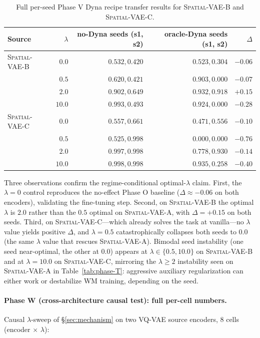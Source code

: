 \documentclass{article}
\newcommand{\srcVA}{\textsc{Spatial-VAE-A}}
\newcommand{\srcVB}{\textsc{Spatial-VAE-B}}
\newcommand{\srcVC}{\textsc{Spatial-VAE-C}}
\begin{document}
\begin{table}[h]
  \centering
  \small
  \caption{Full per-seed Phase V Dyna recipe transfer results for \srcVB{} and \srcVC{}.}
  \label{tab:phase-v-full}
  \begin{tabular}{l r r r r}
    \toprule
    Source & $\lambda$ & no-Dyna seeds (s1, s2) & oracle-Dyna seeds (s1, s2) & $\Delta$ \\
    \midrule
    \srcVB{} & $0.0$ & $0.532, 0.420$ & $0.523, 0.304$ & $-0.06$ \\
    & $0.5$ & $0.620, 0.421$ & $0.903, \mathbf{0.000}$ & $-0.07$ \\
    & $\mathbf{2.0}$ & $0.902, 0.649$ & $\mathbf{0.932, 0.918}$ & $\mathbf{+0.15}$ \\
    & $10.0$ & $0.993, 0.493$ & $0.924, \mathbf{0.000}$ & $-0.28$ \\
    \midrule
    \srcVC{} & $0.0$ & $0.557, 0.661$ & $0.471, 0.556$ & $-0.10$ \\
    & $0.5$ & $0.525, 0.998$ & $\mathbf{0.000, 0.000}$ & $-0.76$ \\
    & $2.0$ & $0.997, 0.998$ & $0.778, 0.930$ & $-0.14$ \\
    & $10.0$ & $0.998, 0.998$ & $0.935, 0.258$ & $-0.40$ \\
    \bottomrule
  \end{tabular}
\end{table}

Three observations confirm the regime-conditional optimal-$\lambda$ claim. First, the $\lambda{=}0$ control reproduces the no-effect Phase O baseline ($\Delta \approx -0.06$ on both encoders), validating the fine-tuning step. Second, on \srcVB{} the optimal $\lambda$ is $\mathbf{2.0}$ rather than the $0.5$ optimal on \srcVA{}, with $\Delta = +0.15$ on both seeds. Third, on \srcVC{}---which already solves the task at vanilla---no $\lambda$ value yields positive $\Delta$, and $\lambda{=}0.5$ catastrophically collapses both seeds to $0.0$ (the same $\lambda$ value that rescues \srcVA{}). Bimodal seed instability (one seed near-optimal, the other at $0.0$) appears at $\lambda{\in}\{0.5, 10.0\}$ on \srcVB{} and at $\lambda{=}10.0$ on \srcVC{}, mirroring the $\lambda{\geq}2$ instability seen on \srcVA{} in Table~\ref{tab:phase-T}: aggressive auxiliary regularization can either work or destabilize WM training, depending on the seed.

\paragraph{Phase W (cross-architecture causal test): full per-cell numbers.} Causal $\lambda$-sweep of \S\ref{sec:mechanism} on two VQ-VAE source encoders, $8$ cells (encoder $\times$ $\lambda$):
\end{document}
